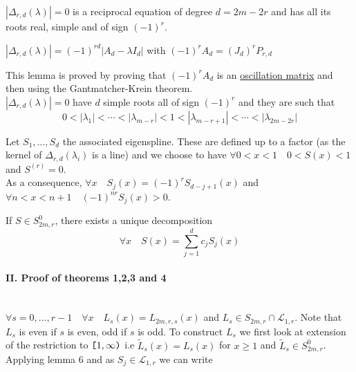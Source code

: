 \documentclass[a4paper, 11pt]{article}
\begin{document}
\begin{thm}{5}
  $|\Delta_{r,d}(\lambda)|=0$ is a reciprocal equation of degree $d=2m-2r$ and has all its roots real, simple and of 
  sign ${(-1)}^r$.
\end{thm}

\begin{lem}{3} $|\Delta_{r,d}(\lambda)| = {(-1)}^{rd} |A_d - \lambda I_d|$ with ${(-1)}^r A_d = {(J_d)}^r P_{r,d}$
\end{lem}

This lemma is proved by proving that ${(-1)}^{r} A_d$ is an \underline{oscillation matrix} and then using the 
Gantmatcher-Krein theorem. \\

$|\Delta_{r,d}(\lambda)|=0$ have $d$ simple roots all of sign ${(-1)}^{r}$ and they are such that
\begin{equation}
  0 < |\lambda_1| < \cdots < |\lambda_{m-r}| < 1 < |\lambda_{m-r+1}| < \cdots < |\lambda_{2m-2r}|
\end{equation}

Let $S_1, \ldots, S_d$ the associated eigenspline. These are defined up to a factor (as the kernel of 
$\Delta_{r,d}(\lambda_i)$ is a line) and we choose to have $\forall 0<x<1 \quad 0 < S(x) < 1$ and $S^{(r)} = 0$.  \\ 

As a consequence, $\forall x \quad S_j(x) = {(-1)}^{r} S_{d-j+1}(x)$ and $\forall n < x < n+1 \quad {(-1)}^{nr}S_j(x) > 
0$.

\begin{lem}{6}
  If $S \in S^0_{2m, r}$, there exists a unique decomposition
  \begin{equation}
    \forall x \quad S(x) = \sum_{j=1}^d c_j S_j(x)
  \end{equation}
\end{lem}

\paragraph{II\@. Proof of theorems 1,2,3 and 4} \mbox{} \\

$\forall s=0, \ldots, r-1 \quad \forall x \quad L_s(x) = L_{2m, r, s}(x)$ and $L_s \in S_{2m,r} \cap \mathcal{L}_{1,r}$.
Note that $L_s$ is even if $s$ is even, odd if $s$ is odd. To construct $L_s$ we first look at extension of the 
restriction to $\verb+[+1, \infty\verb+)+$ i.e $\tilde{L}_s(x) = L_s(x)$ for $x \geq 1$ and $\tilde{L}_s \in 
S^0_{2m,r}$. Applying lemma 6 and as $S_j \in \mathcal{L}_{1,r}$ we can write
\end{document}
